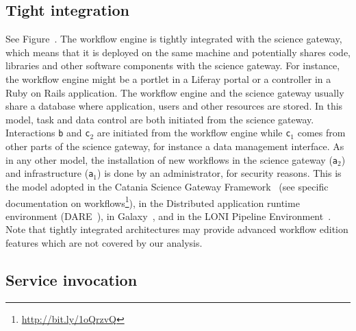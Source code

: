 \documentclass[preprint,3p,twocolumn]{elsarticle}
\newcommand{\note}[2]{\pdfmargincomment[color=yellow,author=#1,open=true]{#2}}
\newcommand{\closednote}[4]{} %
\begin{document}
\subsection{Tight integration}

See Figure~. The workflow engine is tightly
integrated with the science gateway, which means that it is deployed
on the same machine and potentially shares code, libraries and other
software components with the science gateway. For instance, the
workflow engine might be a portlet in a Liferay portal or a controller
in a Ruby on Rails application. The workflow engine and the science
gateway usually share a database where application, users and other
resources are stored\closednote{sorina}{VIP and Moteur also share the
  WorkflowsDB}{Tristan}{Yes, you are right. This is an example where
  such abstract architectures may not completely apply in real
  life. See comment about ``blended'' architectures in the
  discussion. In case of VIP, the sharing of the DB is more an
  implementation detail rather than a strong architectural pattern: we
  could avoid sharing the DB if we wanted.}.  In this model, task and
data control are both initiated from the science gateway. Interactions
\texttt{b} and \texttt{c$_2$} are initiated from the workflow engine
while \texttt{c$_1$} comes from other parts of the science gateway,
for instance a data management interface. As in any other model, the
installation of new workflows in the science gateway (\texttt{a$_2$})
and infrastructure (\texttt{a$_1$}) is done by an administrator, for
security reasons. This is the model adopted in the Catania Science
Gateway Framework~\cite{Ardizzone2012} (see specific documentation on
workflows\footnote{\url{http://bit.ly/1oQrzvQ}}), in the Distributed
application runtime environment
(DARE~\cite{maddineni2012distributed}), in
Galaxy~\cite{goecks2010galaxy}, and in the LONI Pipeline
Environment~\cite{dinov2009efficient}. Note that tightly integrated
architectures may provide advanced workflow edition features which are
not covered by our analysis.

\subsection{Service invocation}
\end{document}
